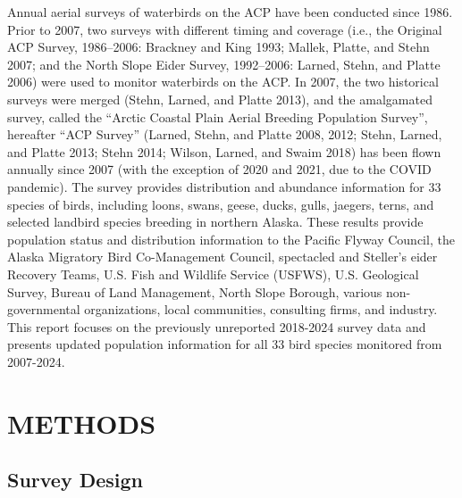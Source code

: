 \documentclass[
]{article}
\begin{document}
Annual aerial surveys of waterbirds on the ACP have been conducted since
1986. Prior to 2007, two surveys with different timing and coverage
(i.e., the Original ACP Survey, 1986--2006: Brackney and King 1993;
Mallek, Platte, and Stehn 2007; and the North Slope Eider Survey,
1992--2006: Larned, Stehn, and Platte 2006) were used to monitor
waterbirds on the ACP. In 2007, the two historical surveys were merged
(Stehn, Larned, and Platte 2013), and the amalgamated survey, called the
``Arctic Coastal Plain Aerial Breeding Population Survey'', hereafter
``ACP Survey'' (Larned, Stehn, and Platte 2008, 2012; Stehn, Larned, and
Platte 2013; Stehn 2014; Wilson, Larned, and Swaim 2018) has been flown
annually since 2007 (with the exception of 2020 and 2021, due to the
COVID pandemic). The survey provides distribution and abundance
information for 33 species of birds, including loons, swans, geese,
ducks, gulls, jaegers, terns, and selected landbird species breeding in
northern Alaska. These results provide population status and
distribution information to the Pacific Flyway Council, the Alaska
Migratory Bird Co-Management Council, spectacled and Steller's eider
Recovery Teams, U.S. Fish and Wildlife Service (USFWS), U.S. Geological
Survey, Bureau of Land Management, North Slope Borough, various
non-governmental organizations, local communities, consulting firms, and
industry. This report focuses on the previously unreported 2018-2024
survey data and presents updated population information for all 33 bird
species monitored from 2007-2024.

\section*{METHODS}\label{methods}

\subsection*{Survey Design}\label{survey-design}
\end{document}
